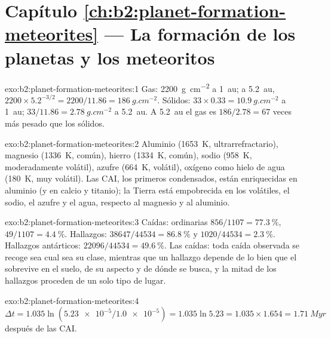 \section*{Capítulo \ref{ch:b2:planet-formation-meteorites} --- La formación de los planetas y los meteoritos}

\begin{solution}{exo:b2:planet-formation-meteorites:1}
Gas: \qty{2200}{g.cm^{-2}} a \qty{1}{au}; a \qty{5.2}{au},
$2200\times5.2^{-3/2} = 2200/11.86 = \qty{186}{g.cm^{-2}}$. Sólidos:
$33\times0.33 = \qty{10.9}{g.cm^{-2}}$ a \qty{1}{au};
$33/11.86 = \qty{2.78}{g.cm^{-2}}$ a \qty{5.2}{au}. A \qty{5.2}{au} el gas es
$186/2.78 = 67$ veces más pesado que los sólidos.
\end{solution}

\begin{solution}{exo:b2:planet-formation-meteorites:2}
Aluminio (\qty{1653}{K}, ultrarrefractario), magnesio (\qty{1336}{K}, común),
hierro (\qty{1334}{K}, común), sodio (\qty{958}{K}, moderadamente volátil), azufre
(\qty{664}{K}, volátil), oxígeno como hielo de agua (\qty{180}{K}, muy volátil).
Las CAI, los primeros condensados, están enriquecidas en aluminio (y en calcio y titanio);
la Tierra está empobrecida en los volátiles, el sodio, el azufre y el agua, respecto al
magnesio y al aluminio.
\end{solution}

\begin{solution}{exo:b2:planet-formation-meteorites:3}
Caídas:  ordinarias $856/1107 = \qty{77.3}{\percent}$, 
$49/1107 = \qty{4.4}{\percent}$. Hallazgos: $38647/44534 = \qty{86.8}{\percent}$ y
$1020/44534 = \qty{2.3}{\percent}$. Hallazgos antárticos: $22096/44534 =
\qty{49.6}{\percent}$. Las caídas: toda caída observada se recoge sea cual sea su
clase, mientras que un hallazgo depende de lo bien que el  sobrevive en el suelo,
de su aspecto y de dónde se busca, y la mitad de los hallazgos proceden de un solo tipo de
lugar.
\end{solution}

\begin{solution}{exo:b2:planet-formation-meteorites:4}
$\Delta t = 1.035\ln(\num{5.23e-5}/\num{1.0e-5}) = 1.035\ln 5.23 =
1.035\times1.654 = \qty{1.71}{Myr}$ después de las CAI.
\end{solution}


